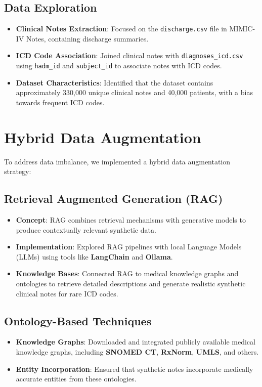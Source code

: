 \documentclass[12pt,a4paper]{report}
\begin{document}
\subsection{Data Exploration}
\begin{itemize}
    \item \textbf{Clinical Notes Extraction}: Focused on the \texttt{discharge.csv} file in MIMIC-IV Notes, containing discharge summaries.
    \item \textbf{ICD Code Association}: Joined clinical notes with \texttt{diagnoses\_icd.csv} using \texttt{hadm\_id} and \texttt{subject\_id} to associate notes with ICD codes.
    \item \textbf{Dataset Characteristics}: Identified that the dataset contains approximately 330,000 unique clinical notes and 40,000 patients, with a bias towards frequent ICD codes.
\end{itemize}

\section{Hybrid Data Augmentation}
To address data imbalance, we implemented a hybrid data augmentation strategy:

\subsection{Retrieval Augmented Generation (RAG)}
\begin{itemize}
    \item \textbf{Concept}: RAG combines retrieval mechanisms with generative models to produce contextually relevant synthetic data.
    \item \textbf{Implementation}: Explored RAG pipelines with local Language Models (LLMs) using tools like \textbf{LangChain} and \textbf{Ollama}.
    \item \textbf{Knowledge Bases}: Connected RAG to medical knowledge graphs and ontologies to retrieve detailed descriptions and generate realistic synthetic clinical notes for rare ICD codes.
\end{itemize}

\subsection{Ontology-Based Techniques}
\begin{itemize}
    \item \textbf{Knowledge Graphs}: Downloaded and integrated publicly available medical knowledge graphs, including \textbf{SNOMED CT}, \textbf{RxNorm}, \textbf{UMLS}, and others.
    \item \textbf{Entity Incorporation}: Ensured that synthetic notes incorporate medically accurate entities from these ontologies.
\end{itemize}
\end{document}

